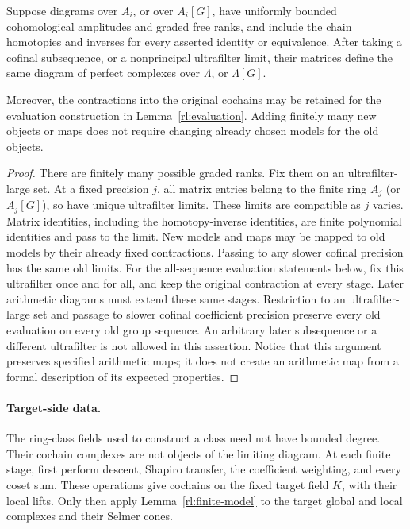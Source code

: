 \begin{lemma}\label{rl:finite-limits}
Suppose diagrams over $A_i$, or over $A_i[G]$, have uniformly bounded cohomological amplitudes and graded free
ranks, and include the chain homotopies and inverses for every asserted
identity or equivalence.  After taking a cofinal subsequence, or a
nonprincipal ultrafilter limit, their matrices define the same diagram of
perfect complexes over $\Lambda$, or $\Lambda[G]$.

Moreover, the contractions into the original cochains may be retained for
the evaluation construction in Lemma~\ref{rl:evaluation}.  Adding finitely
many new objects or maps does not require changing already chosen models
for the old objects.
\end{lemma}

\begin{proof}
There are finitely many possible graded ranks.  Fix them on an
ultrafilter-large set.  At a fixed precision $j$, all matrix entries belong
to the finite ring $A_j$ (or $A_j[G]$), so have unique ultrafilter limits.
These limits are compatible as $j$ varies.  Matrix identities, including
the homotopy-inverse identities, are finite polynomial identities and pass
to the limit.  New models and maps may be mapped to old models by their
already fixed contractions.  Passing to any slower cofinal precision has
the same old limits.  For the all-sequence evaluation statements below,
fix this ultrafilter once and for all, and keep the original contraction
at every stage.  Later arithmetic diagrams must extend these same
stages.  Restriction to an ultrafilter-large set and passage to slower
cofinal coefficient precision preserve every old evaluation on every
old group sequence.  An arbitrary later subsequence or a different
ultrafilter is not allowed in this assertion.  Notice that this argument preserves specified
arithmetic maps; it does not create an arithmetic map from a formal
description of its expected properties.
\end{proof}

\paragraph{Target-side data.}
The ring-class fields used to construct a class need not have bounded
degree.  Their cochain complexes are not objects of the limiting diagram.
At each finite stage, first perform descent, Shapiro transfer, the
coefficient weighting, and every coset sum.  These operations give
cochains on the fixed target field \(K\), with their local lifts.  Only
then apply Lemma~\ref{rl:finite-model} to the target global and local
complexes and their Selmer cones.


